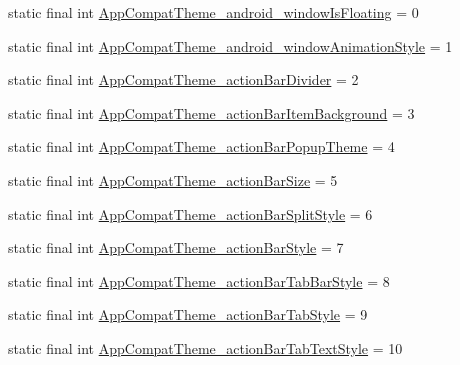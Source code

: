\begin{DoxyCompactItemize}
\item 
static final int \mbox{\hyperlink{classandroid_1_1support_1_1v7_1_1appcompat_1_1_r_1_1styleable_a76518c13bb691fa0ce88562201777677}{App\+Compat\+Theme\+\_\+android\+\_\+window\+Is\+Floating}} = 0
\item 
static final int \mbox{\hyperlink{classandroid_1_1support_1_1v7_1_1appcompat_1_1_r_1_1styleable_aab662ec6e7b7c13b0cc7eefd6dc448ed}{App\+Compat\+Theme\+\_\+android\+\_\+window\+Animation\+Style}} = 1
\item 
static final int \mbox{\hyperlink{classandroid_1_1support_1_1v7_1_1appcompat_1_1_r_1_1styleable_a0b6a6525bb825aaaecee70188288cb9e}{App\+Compat\+Theme\+\_\+action\+Bar\+Divider}} = 2
\item 
static final int \mbox{\hyperlink{classandroid_1_1support_1_1v7_1_1appcompat_1_1_r_1_1styleable_a46d9d9ade7a2cbff036f30b78e1f8a32}{App\+Compat\+Theme\+\_\+action\+Bar\+Item\+Background}} = 3
\item 
static final int \mbox{\hyperlink{classandroid_1_1support_1_1v7_1_1appcompat_1_1_r_1_1styleable_adcf6cf3f0cfa84f27687f9d615f0a74f}{App\+Compat\+Theme\+\_\+action\+Bar\+Popup\+Theme}} = 4
\item 
static final int \mbox{\hyperlink{classandroid_1_1support_1_1v7_1_1appcompat_1_1_r_1_1styleable_a74f2d53b62c6128eda991786ee5dcfd1}{App\+Compat\+Theme\+\_\+action\+Bar\+Size}} = 5
\item 
static final int \mbox{\hyperlink{classandroid_1_1support_1_1v7_1_1appcompat_1_1_r_1_1styleable_acb1649c0b7461ebc585fa51419a608e8}{App\+Compat\+Theme\+\_\+action\+Bar\+Split\+Style}} = 6
\item 
static final int \mbox{\hyperlink{classandroid_1_1support_1_1v7_1_1appcompat_1_1_r_1_1styleable_af0c42e22b440ed03547894f75a6c8d59}{App\+Compat\+Theme\+\_\+action\+Bar\+Style}} = 7
\item 
static final int \mbox{\hyperlink{classandroid_1_1support_1_1v7_1_1appcompat_1_1_r_1_1styleable_af090ecefe331b4df72abe9c0674e9154}{App\+Compat\+Theme\+\_\+action\+Bar\+Tab\+Bar\+Style}} = 8
\item 
static final int \mbox{\hyperlink{classandroid_1_1support_1_1v7_1_1appcompat_1_1_r_1_1styleable_a013b2eecd9534f6bbc9905fc20d48e80}{App\+Compat\+Theme\+\_\+action\+Bar\+Tab\+Style}} = 9
\item 
static final int \mbox{\hyperlink{classandroid_1_1support_1_1v7_1_1appcompat_1_1_r_1_1styleable_ab3821559efba8c3cd95dfb07a70866eb}{App\+Compat\+Theme\+\_\+action\+Bar\+Tab\+Text\+Style}} = 10
\item 

\end{DoxyCompactItemize}
